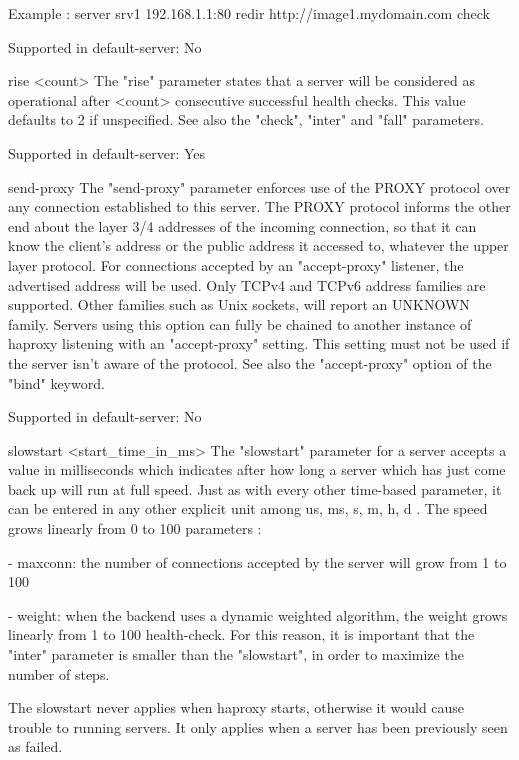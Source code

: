  Example :  server srv1 192.168.1.1:80 redir http://image1.mydomain.com check

  Supported in default-server: No

rise <count>
  The "rise" parameter states that a server will be considered as operational
  after <count> consecutive successful health checks. This value defaults to 2
  if unspecified. See also the "check", "inter" and "fall" parameters.

  Supported in default-server: Yes

send-proxy
  The "send-proxy" parameter enforces use of the PROXY protocol over any
  connection established to this server. The PROXY protocol informs the other
  end about the layer 3/4 addresses of the incoming connection, so that it can
  know the client's address or the public address it accessed to, whatever the
  upper layer protocol. For connections accepted by an "accept-proxy" listener,
  the advertised address will be used. Only TCPv4 and TCPv6 address families
  are supported. Other families such as Unix sockets, will report an UNKNOWN
  family. Servers using this option can fully be chained to another instance of
  haproxy listening with an "accept-proxy" setting. This setting must not be
  used if the server isn't aware of the protocol. See also the "accept-proxy"
  option of the "bind" keyword.

  Supported in default-server: No

slowstart <start_time_in_ms>
  The "slowstart" parameter for a server accepts a value in milliseconds which
  indicates after how long a server which has just come back up will run at
  full speed. Just as with every other time-based parameter, it can be entered
  in any other explicit unit among { us, ms, s, m, h, d }. The speed grows
  linearly from 0 to 100%
  parameters :

  - maxconn: the number of connections accepted by the server will grow from 1
    to 100%

  - weight: when the backend uses a dynamic weighted algorithm, the weight
    grows linearly from 1 to 100%
    health-check. For this reason, it is important that the "inter" parameter
    is smaller than the "slowstart", in order to maximize the number of steps.

  The slowstart never applies when haproxy starts, otherwise it would cause
  trouble to running servers. It only applies when a server has been previously
  seen as failed.

